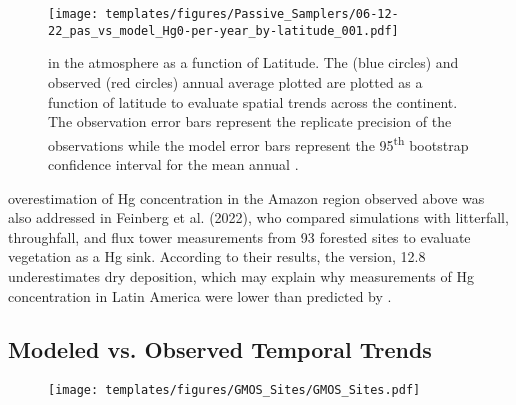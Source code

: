\begin{figure}[H]
  \texttt{[image: templates/figures/Passive\_Samplers/06-12-22\_pas\_vs\_model\_Hg0-per-year\_by-latitude\_001.pdf]}
  \caption{\hg in the atmosphere as a function of Latitude. The \on (blue circles) and observed (red circles) annual average \hg plotted are plotted as a function of latitude to evaluate spatial trends across the continent. The observation error bars represent the replicate precision of the observations while the model error bars represent the 95\textsuperscript{th} bootstrap confidence interval for the mean annual \hg.}
  \label{fig:06-12-22_pas_vs_model_Hg0-per-year_by-latitude_001}
  \centering
  
\end{figure}
\FloatBarrier
\begin{flushleft}
    \gcs overestimation of Hg concentration in the Amazon region observed above was also addressed in Feinberg et al. (2022), who compared simulations with litterfall, throughfall, and flux tower measurements from 93 forested sites to evaluate vegetation as a Hg sink. According to their results, the \gc version, 12.8 underestimates \hg dry deposition, which may explain why measurements of Hg concentration in Latin America were lower than predicted by \gc. 

\end{flushleft}

\subsection{Modeled vs. Observed Temporal Trends}\label{c2_modeled_vs_observed_trends}
\begin{figure}[H]
\texttt{[image: templates/figures/GMOS\_Sites/GMOS\_Sites.pdf]}
\centering
{}
\label{fig:GMOSvsGC}
\end{figure}
\FloatBarrier



